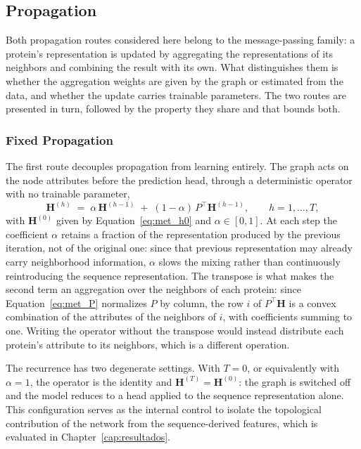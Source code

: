 \documentclass[Ingles]{ic-tese-v3}
\begin{document}
\subsection{Propagation}
\label{sec:met_prop}

Both propagation routes considered here belong to the message-passing family: a protein's
representation is updated by aggregating the representations of its neighbors and combining the
result with its own. What distinguishes them is whether the aggregation weights are given by the
graph or estimated from the data, and whether the update carries trainable parameters. The two
routes are presented in turn, followed by the property they share and that bounds both.

\subsubsection{Fixed Propagation}
\label{sec:met_fixa}

The first route decouples propagation from learning entirely. The graph acts on the node attributes
before the prediction head, through a deterministic operator with no trainable parameter,
\begin{equation}
  \mathbf{H}^{(h)} \;=\; \alpha\, \mathbf{H}^{(h-1)}
  \;+\; (1-\alpha)\, P^{\top} \mathbf{H}^{(h-1)},
  \qquad h = 1, \dots, T,
  \label{eq:met_recorrencia}
\end{equation}
\noindent with $\mathbf{H}^{(0)}$ given by Equation~\eqref{eq:met_h0} and $\alpha \in [0,1]$. At each step the
coefficient $\alpha$ retains a fraction of the representation produced by the previous iteration,
not
of the original one: since that previous representation may already carry neighborhood information,
$\alpha$ slows the mixing rather than continuously reintroducing the sequence representation. The
transpose is what makes the second term an aggregation over
the neighbors of each protein: since Equation~\eqref{eq:met_P} normalizes $P$ by column, the
row $i$ of $P^{\top}\mathbf{H}$ is a convex combination of the attributes of the neighbors of $i$,
with coefficients summing to one. Writing the operator without the transpose would instead
distribute each protein's attribute to its neighbors, which is a different operation.

The recurrence has two degenerate settings. With $T = 0$, or equivalently with $\alpha = 1$, the
operator is the identity and $\mathbf{H}^{(T)} = \mathbf{H}^{(0)}$: the graph is switched off and the
model reduces to a head applied to the sequence representation alone. This configuration serves as
the internal control to isolate the topological contribution of the network from the
sequence-derived features, which is evaluated in Chapter~\ref{cap:resultados}.
\end{document}
